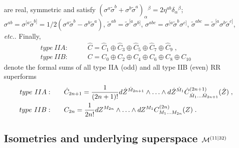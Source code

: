 \documentclass[a4paper,11pt]{article}
\begin{document}
are real, symmetric and 
 satisfy $(\sigma^a \tilde{\sigma}^b + 
\sigma^b \tilde{\sigma}^a)_\alpha{}^\beta = 2\eta^{ab}\delta_\alpha{}^\beta$; 
$\sigma^{ab}= \sigma^{[a} \tilde{\sigma}^{b]}= 1/2 
(\sigma^a \tilde{\sigma}^b -
\sigma^b \tilde{\sigma}^a)$, 
$\tilde{\sigma}^{ab}= \tilde{\sigma}^{[a} {\sigma}^{b]}$, 
$\sigma^{abc}= \sigma^{[a} \tilde{\sigma}^{b}\sigma^{c]}$, 
$\tilde{\sigma}^{abc}=   \tilde{\sigma}^{[a}  \sigma^{b} \tilde{\sigma}^{c]}$, 
{\it etc.}. 
Finally, 
\begin{eqnarray}
\label{rhC=hC+hC+}
type~ IIA: \qquad & \hat{C} =\hat{C}_1 \oplus \hat{C}_3  \oplus 
\hat{C}_5 \oplus \hat{C}_7  \oplus \hat{C}_9 \; , & \qquad 
\\ 
\label{rC=C+C+}
type~ IIB: \qquad & C=C_0 \oplus C_2 \oplus C_4  \oplus C_6  \oplus C_8 
\oplus C_{10} 
\;    
& \qquad 
\end{eqnarray}
denote the formal sums  of all type IIA (odd) and all type IIB (even)  
RR superforms 
\begin{eqnarray}
\label{rCIIA}
type~ IIA: \qquad & \hat{C}_{2n+1}
={1 \over (2n+1)!}
d\hat{Z}^{ {\hat{M}}_{2n+1}} \wedge \ldots \wedge
d\hat{Z}^{ {\hat{M}}_1}
\hat{C}^{(2n+1)}_{ {\hat{M}}_1\ldots
 {\hat{M}}_{2n+1}}(\hat{Z})\; ,
\\ \label{rCIIB} 
type~ IIB: \qquad &
C_{2n}
={1 \over 2n!}
dZ^{ {M}_{2n}} \wedge \ldots \wedge
dZ^{ {M}_1}C^{(2n)}_{ {M}_1\ldots  {M}_{2n}}(Z) \; .
\end{eqnarray}

\subsection{Isometries and underlying 
superspace ${\cal M}^{(11|32)}$}
\end{document}
